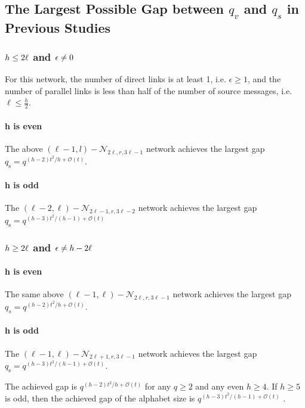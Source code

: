 \subsection{The Largest Possible Gap between $q_{v}$ and $q_{s}$ in Previous
Studies}

\subsubsection{$h\protect\leq2\ell$ and $\epsilon\protect\neq0$}

For this network, the number of direct links is at least 1, i.e. $\epsilon\geq1$,
and the number of parallel links is less than half of the number of
source messages, i.e. $\ell\leq\frac{h}{2}$.

\paragraph{h is even}

The above $\left(\ell-1,l\right)-\mathcal{N}_{2\ell,r,3\ell-1}$ network
achieves the largest gap $q_{\mathrm{s}}=q^{(h-2)t^{2}/h+\mathcal{O}(t)}$.

\paragraph{h is odd}

The $\left(\ell-2,\ell\right)-\mathcal{N}_{2\ell-1,r,3\ell-2}$ network
achieves the largest gap $q_{\mathrm{s}}=q^{\left(h-3\right)t^{2}/\left(h-1\right)+\mathcal{O}(t)}$

\subsubsection{$h\protect\geq2\ell$ and $\epsilon\protect\neq h-2\ell$}

\paragraph{h is even}

The same above $\left(\ell-1,\ell\right)-\mathcal{N}_{2\ell,r,3\ell-1}$
network achieves the largest gap $q_{s}=q^{(h-2)t^{2}/h+\mathcal{O}(t)}$.

\paragraph{h is odd}

The $\left(\ell-1,\ell\right)-\mathcal{N}_{2\ell+1,r,3\ell-1}$ network
achieves the largest gap $q_{\mathrm{s}}=q^{(h-3)t^{2}/\left(h-1\right)+\mathcal{O}(t)}$.
\begin{rem}
The achieved gap is $q^{(h-2)t^{2}/h+\mathcal{O}(t)}$ for any $q\geq2$
and any even $h\geq4$. If $h\geq5$ is odd, then the achieved gap
of the alphabet size is $q^{(h-3)t^{2}/\left(h-1\right)+\mathcal{O}(t)}$
\cite{Wachter-Zeh:2018}.
\end{rem}

\clearpage